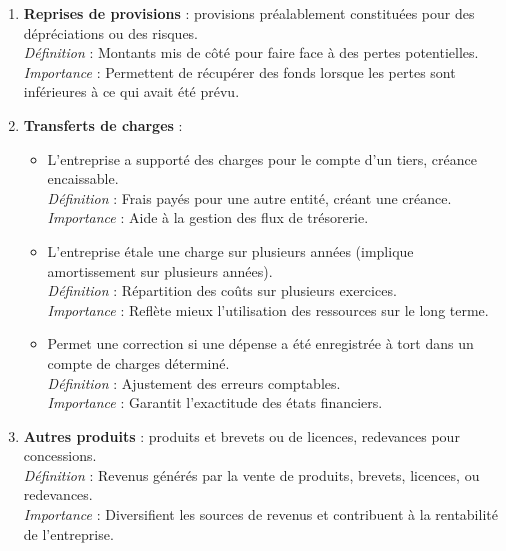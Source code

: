 \documentclass[a4paper, 12pt]{report}
\begin{document}
\begin{enumerate}
\item \textbf{Reprises de provisions} : provisions préalablement constituées pour des dépréciations ou des risques.\\
\textit{Définition} : Montants mis de côté pour faire face à des pertes potentielles.\\
\textit{Importance} : Permettent de récupérer des fonds lorsque les pertes sont inférieures à ce qui avait été prévu.

\item \textbf{Transferts de charges} :
\begin{itemize}
	\item L'entreprise a supporté des charges pour le compte d'un tiers, créance encaissable.\\
	\textit{Définition} : Frais payés pour une autre entité, créant une créance.\\
	\textit{Importance} : Aide à la gestion des flux de trésorerie.
	
	\item L'entreprise étale une charge sur plusieurs années (implique amortissement sur plusieurs années).\\
	\textit{Définition} : Répartition des coûts sur plusieurs exercices.\\
	\textit{Importance} : Reflète mieux l'utilisation des ressources sur le long terme.
	
	\item Permet une correction si une dépense a été enregistrée à tort dans un compte de charges déterminé.\\
	\textit{Définition} : Ajustement des erreurs comptables.\\
	\textit{Importance} : Garantit l'exactitude des états financiers.
\end{itemize}

\item \textbf{Autres produits} : produits et brevets ou de licences, redevances pour concessions.\\
\textit{Définition} : Revenus générés par la vente de produits, brevets, licences, ou redevances.\\
\textit{Importance} : Diversifient les sources de revenus et contribuent à la rentabilité de l'entreprise.
\end{enumerate}
\end{document}
